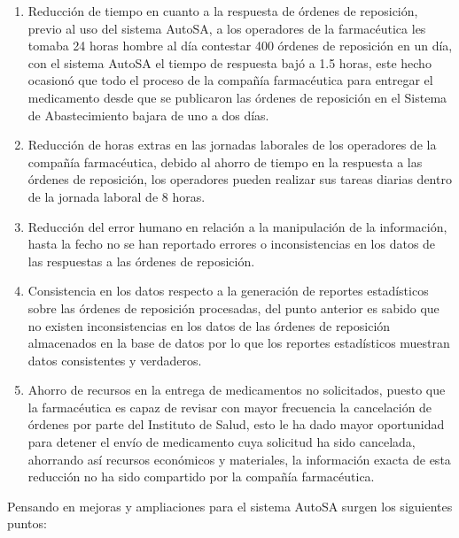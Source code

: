 \begin{enumerate}
	\item Reducción de tiempo en cuanto a la respuesta de órdenes de reposición, previo al uso del sistema AutoSA, a los operadores de la farmacéutica les tomaba 24 horas hombre al día contestar 400 órdenes de reposición en un día, con el sistema AutoSA el tiempo de respuesta bajó a 1.5 horas, este hecho ocasionó que todo el proceso de la compañía farmacéutica para entregar el medicamento desde que se publicaron las órdenes de reposición en el Sistema de Abastecimiento bajara de uno a dos días.
	\item Reducción de horas extras en las jornadas laborales de los operadores de la compañía farmacéutica, debido al ahorro de tiempo en la respuesta a las órdenes de reposición, los operadores pueden realizar sus tareas diarias dentro de la jornada laboral de 8 horas.
	\item Reducción del error humano en relación a la manipulación de la información, hasta la fecho no se han reportado errores o inconsistencias en los datos de las respuestas a las órdenes de reposición.
	\item Consistencia en los datos respecto a la generación de reportes estadísticos sobre las órdenes de reposición procesadas, del punto anterior es sabido que no existen inconsistencias en los datos de las órdenes de reposición almacenados en la base de datos por lo que los reportes estadísticos muestran datos consistentes y verdaderos.
	\item Ahorro de recursos en la entrega de medicamentos no solicitados, puesto que la farmacéutica es capaz de revisar con mayor frecuencia la cancelación de órdenes por parte del Instituto de Salud, esto le ha dado mayor oportunidad para detener el envío de medicamento cuya solicitud ha sido cancelada, ahorrando así recursos económicos y materiales, la información exacta de esta reducción no ha sido compartido por la compañía farmacéutica.
\end{enumerate}
Pensando en mejoras y ampliaciones para el sistema AutoSA surgen los siguientes puntos:
